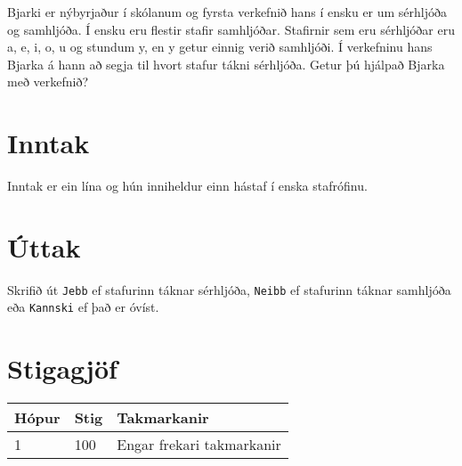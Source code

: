%
Bjarki er nýbyrjaður í skólanum og fyrsta verkefnið hans í ensku er um sérhljóða og samhljóða.
Í ensku eru flestir stafir samhljóðar.
Stafirnir sem eru sérhljóðar eru a, e, i, o, u og stundum y, en y getur einnig verið samhljóði.
Í verkefninu hans Bjarka á hann að segja til hvort stafur tákni sérhljóða.
Getur þú hjálpað Bjarka með verkefnið?

\section*{Inntak}
Inntak er ein lína og hún inniheldur einn hástaf í enska stafrófinu. 

\section*{Úttak}
Skrifið út \texttt{Jebb} ef stafurinn táknar sérhljóða,
\texttt{Neibb} ef stafurinn táknar samhljóða eða \texttt{Kannski} ef það er óvíst.

\section*{Stigagjöf}
\begin{tabular}{|l|l|l|}
\hline
Hópur & Stig & Takmarkanir \\ \hline
1     & 100  & Engar frekari takmarkanir \\ \hline
\end{tabular}

